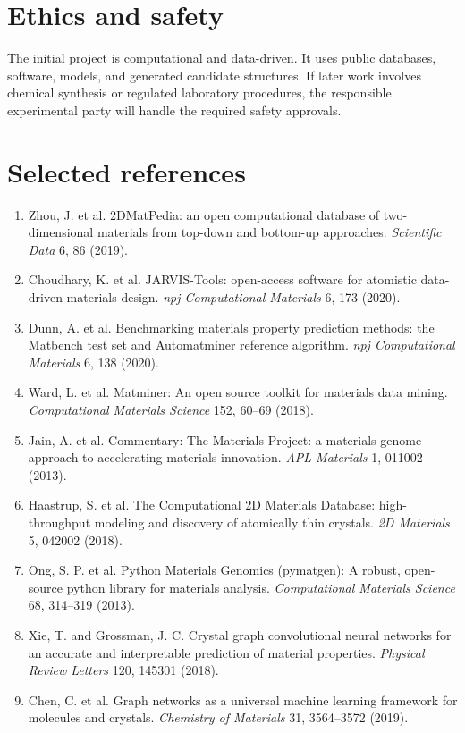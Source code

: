 \documentclass[10pt]{article}
\begin{document}
\section*{Ethics and safety}
The initial project is computational and data-driven. It uses public databases, software, models, and generated candidate structures. If later work involves chemical synthesis or regulated laboratory procedures, the responsible experimental party will handle the required safety approvals.

\section*{Selected references}
\small
\begin{enumerate}[leftmargin=1.2em,itemsep=1pt]
  \item Zhou, J. et al. 2DMatPedia: an open computational database of two-dimensional materials from top-down and bottom-up approaches. \textit{Scientific Data} 6, 86 (2019).
  \item Choudhary, K. et al. JARVIS-Tools: open-access software for atomistic data-driven materials design. \textit{npj Computational Materials} 6, 173 (2020).
  \item Dunn, A. et al. Benchmarking materials property prediction methods: the Matbench test set and Automatminer reference algorithm. \textit{npj Computational Materials} 6, 138 (2020).
  \item Ward, L. et al. Matminer: An open source toolkit for materials data mining. \textit{Computational Materials Science} 152, 60--69 (2018).
  \item Jain, A. et al. Commentary: The Materials Project: a materials genome approach to accelerating materials innovation. \textit{APL Materials} 1, 011002 (2013).
  \item Haastrup, S. et al. The Computational 2D Materials Database: high-throughput modeling and discovery of atomically thin crystals. \textit{2D Materials} 5, 042002 (2018).
  \item Ong, S. P. et al. Python Materials Genomics (pymatgen): A robust, open-source python library for materials analysis. \textit{Computational Materials Science} 68, 314--319 (2013).
  \item Xie, T. and Grossman, J. C. Crystal graph convolutional neural networks for an accurate and interpretable prediction of material properties. \textit{Physical Review Letters} 120, 145301 (2018).
  \item Chen, C. et al. Graph networks as a universal machine learning framework for molecules and crystals. \textit{Chemistry of Materials} 31, 3564--3572 (2019).

\end{enumerate}
\end{document}
